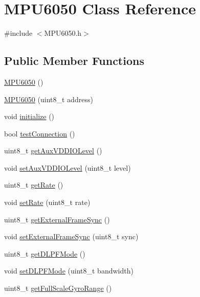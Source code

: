\hypertarget{classMPU6050}{}\section{M\+P\+U6050 Class Reference}
\label{classMPU6050}


{\ttfamily \#include $<$M\+P\+U6050.\+h$>$}

\subsection*{Public Member Functions}
\begin{DoxyCompactItemize}
\item 
\hyperlink{classMPU6050_a7c0146d45537e4bd7a0d4c1c476fdab7}{M\+P\+U6050} ()
\item 
\hyperlink{classMPU6050_a94df4ec1565317ba5279122b3bf7e056}{M\+P\+U6050} (uint8\+\_\+t address)
\item 
void \hyperlink{classMPU6050_abd8fc6c18adf158011118fbccc7e7054}{initialize} ()
\item 
bool \hyperlink{classMPU6050_a95ffab7b44fce3834236e0813687d11a}{test\+Connection} ()
\item 
uint8\+\_\+t \hyperlink{classMPU6050_af6e9af8e2222889fd5458e2ae12c55c8}{get\+Aux\+V\+D\+D\+I\+O\+Level} ()
\item 
void \hyperlink{classMPU6050_a7c666c20e26869bc80646f1b2c3d69bc}{set\+Aux\+V\+D\+D\+I\+O\+Level} (uint8\+\_\+t level)
\item 
uint8\+\_\+t \hyperlink{classMPU6050_a887a173e079980505763ffd1aa9fec05}{get\+Rate} ()
\item 
void \hyperlink{classMPU6050_a7d03801d6b656e8e12cd3c1dd97824a8}{set\+Rate} (uint8\+\_\+t rate)
\item 
uint8\+\_\+t \hyperlink{classMPU6050_a902a7d486cd6ac21f8c378634dc6f59a}{get\+External\+Frame\+Sync} ()
\item 
void \hyperlink{classMPU6050_a77b36f41c531a11b5a835fc75a9aefe6}{set\+External\+Frame\+Sync} (uint8\+\_\+t sync)
\item 
uint8\+\_\+t \hyperlink{classMPU6050_a9f2737fe22955fd85b2575ba8da874c6}{get\+D\+L\+P\+F\+Mode} ()
\item 
void \hyperlink{classMPU6050_a7a782ade8af2f88dfef7171487f59a3b}{set\+D\+L\+P\+F\+Mode} (uint8\+\_\+t bandwidth)
\item 
uint8\+\_\+t \hyperlink{classMPU6050_acb1fa088d43d76230106a3226f343013}{get\+Full\+Scale\+Gyro\+Range} ()
\item 

\end{DoxyCompactItemize}
